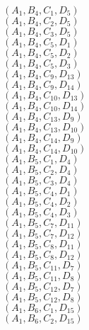 \documentclass[14pt]{article}
\begin{document}
    $({A}_{1}, {B}_{4}, {C}_{1}, {D}_{5}) $ \\ 
    $({A}_{1}, {B}_{4}, {C}_{2}, {D}_{5}) $ \\ 
    $({A}_{1}, {B}_{4}, {C}_{3}, {D}_{5}) $ \\ 
    $({A}_{1}, {B}_{4}, {C}_{5}, {D}_{1}) $ \\ 
    $({A}_{1}, {B}_{4}, {C}_{5}, {D}_{2}) $ \\ 
    $({A}_{1}, {B}_{4}, {C}_{5}, {D}_{3}) $ \\ 
    $({A}_{1}, {B}_{4}, {C}_{9}, {D}_{13}) $ \\ 
    $({A}_{1}, {B}_{4}, {C}_{9}, {D}_{14}) $ \\ 
    $({A}_{1}, {B}_{4}, {C}_{10}, {D}_{13}) $ \\ 
    $({A}_{1}, {B}_{4}, {C}_{10}, {D}_{14}) $ \\ 
    $({A}_{1}, {B}_{4}, {C}_{13}, {D}_{9}) $ \\ 
    $({A}_{1}, {B}_{4}, {C}_{13}, {D}_{10}) $ \\ 
    $({A}_{1}, {B}_{4}, {C}_{14}, {D}_{9}) $ \\ 
    $({A}_{1}, {B}_{4}, {C}_{14}, {D}_{10}) $ \\ 
    $({A}_{1}, {B}_{5}, {C}_{1}, {D}_{4}) $ \\ 
    $({A}_{1}, {B}_{5}, {C}_{2}, {D}_{4}) $ \\ 
    $({A}_{1}, {B}_{5}, {C}_{3}, {D}_{4}) $ \\ 
    $({A}_{1}, {B}_{5}, {C}_{4}, {D}_{1}) $ \\ 
    $({A}_{1}, {B}_{5}, {C}_{4}, {D}_{2}) $ \\ 
    $({A}_{1}, {B}_{5}, {C}_{4}, {D}_{3}) $ \\ 
    $({A}_{1}, {B}_{5}, {C}_{7}, {D}_{11}) $ \\ 
    $({A}_{1}, {B}_{5}, {C}_{7}, {D}_{12}) $ \\ 
    $({A}_{1}, {B}_{5}, {C}_{8}, {D}_{11}) $ \\ 
    $({A}_{1}, {B}_{5}, {C}_{8}, {D}_{12}) $ \\ 
    $({A}_{1}, {B}_{5}, {C}_{11}, {D}_{7}) $ \\ 
    $({A}_{1}, {B}_{5}, {C}_{11}, {D}_{8}) $ \\ 
    $({A}_{1}, {B}_{5}, {C}_{12}, {D}_{7}) $ \\ 
    $({A}_{1}, {B}_{5}, {C}_{12}, {D}_{8}) $ \\ 
    $({A}_{1}, {B}_{6}, {C}_{1}, {D}_{15}) $ \\ 
    $({A}_{1}, {B}_{6}, {C}_{2}, {D}_{15}) $ \\ 
\end{document}
